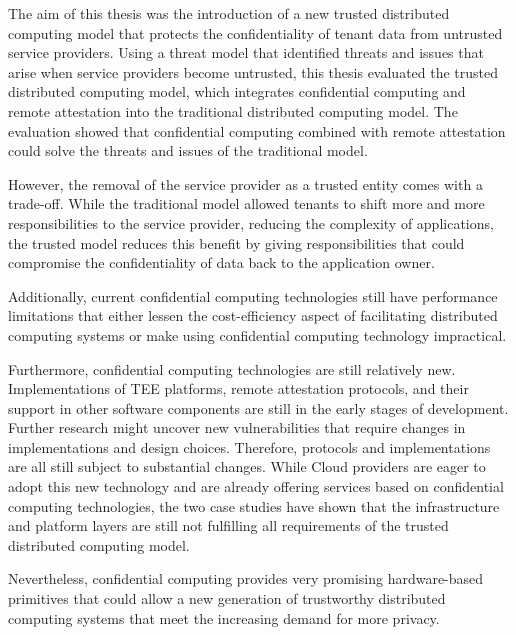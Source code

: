 The aim of this thesis was the introduction of a new trusted distributed
computing model that protects the confidentiality of tenant data from untrusted
service providers. Using a threat model that identified threats and issues that
arise when service providers become untrusted, this thesis evaluated the trusted
distributed computing model, which integrates confidential computing and remote
attestation into the traditional distributed computing model. The evaluation
showed that confidential computing combined with remote attestation could solve
the threats and issues of the traditional model.

However, the removal of the service provider as a trusted entity comes with a
trade-off. While the traditional model allowed tenants to shift more and more
responsibilities to the service provider, reducing the complexity of
applications, the trusted model reduces this benefit by giving responsibilities
that could compromise the confidentiality of data back to the application owner.

Additionally, current confidential computing technologies still have performance
limitations that either lessen the cost-efficiency aspect of facilitating
distributed computing systems or make using confidential computing technology
impractical.

Furthermore, confidential computing technologies are still relatively new.
Implementations of TEE platforms, remote attestation protocols, and their
support in other software components are still in the early stages of
development. Further research might uncover new vulnerabilities that require
changes in implementations and design choices. Therefore, protocols and
implementations are all still subject to substantial changes. While Cloud
providers are eager to adopt this new technology and are already offering
services based on confidential computing technologies, the two case studies have
shown that the infrastructure and platform layers are still not fulfilling all
requirements of the trusted distributed computing model.

Nevertheless, confidential computing provides very promising hardware-based
primitives that could allow a new generation of trustworthy distributed
computing systems that meet the increasing demand for more privacy.
